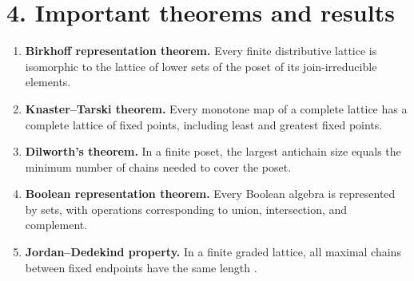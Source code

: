 \section*{4. Important theorems and results}
\begin{enumerate}[leftmargin=*,itemsep=0.35em]
\item \textbf{Birkhoff representation theorem.} Every finite distributive lattice is isomorphic to the lattice of lower sets of the poset of its join-irreducible elements.

\item \textbf{Knaster--Tarski theorem.} Every monotone map of a complete lattice has a complete lattice of fixed points, including least and greatest fixed points.

\item \textbf{Dilworth's theorem.} In a finite poset, the largest antichain size equals the minimum number of chains needed to cover the poset.

\item \textbf{Boolean representation theorem.} Every Boolean algebra is represented by sets, with operations corresponding to union, intersection, and complement.

\item \textbf{Jordan--Dedekind property.} In a finite graded lattice, all maximal chains between fixed endpoints have the same length \cite{lattice_theory_ref4}.
\end{enumerate}

\theoryapplications
{}

